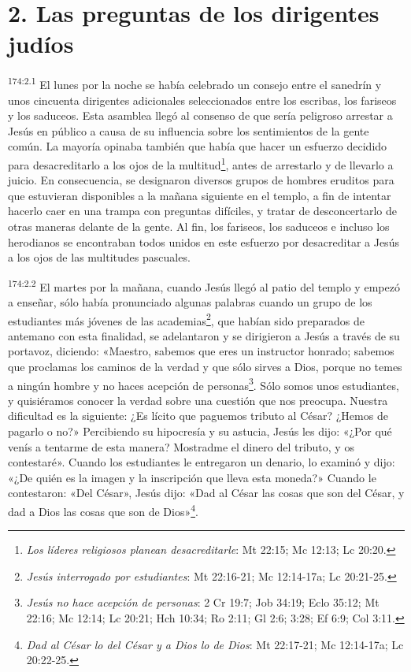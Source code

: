 \section*{2. Las preguntas de los dirigentes judíos}
\par 
\textsuperscript{174:2.1} El lunes por la noche se había celebrado un consejo entre el sanedrín y unos cincuenta dirigentes adicionales seleccionados entre los escribas, los fariseos y los saduceos. Esta asamblea llegó al consenso de que sería peligroso arrestar a Jesús en público a causa de su influencia sobre los sentimientos de la gente común. La mayoría opinaba también que había que hacer un esfuerzo decidido para desacreditarlo a los ojos de la multitud\footnote{\textit{Los líderes religiosos planean desacreditarle}: Mt 22:15; Mc 12:13; Lc 20:20.}, antes de arrestarlo y de llevarlo a juicio. En consecuencia, se designaron diversos grupos de hombres eruditos para que estuvieran disponibles a la mañana siguiente en el templo, a fin de intentar hacerlo caer en una trampa con preguntas difíciles, y tratar de desconcertarlo de otras maneras delante de la gente. Al fin, los fariseos, los saduceos e incluso los herodianos se encontraban todos unidos en este esfuerzo por desacreditar a Jesús a los ojos de las multitudes pascuales.

\par 
\textsuperscript{174:2.2} El martes por la mañana, cuando Jesús llegó al patio del templo y empezó a enseñar, sólo había pronunciado algunas palabras cuando un grupo de los estudiantes más jóvenes de las academias\footnote{\textit{Jesús interrogado por estudiantes}: Mt 22:16-21; Mc 12:14-17a; Lc 20:21-25.}, que habían sido preparados de antemano con esta finalidad, se adelantaron y se dirigieron a Jesús a través de su portavoz, diciendo: «Maestro, sabemos que eres un instructor honrado; sabemos que proclamas los caminos de la verdad y que sólo sirves a Dios, porque no temes a ningún hombre y no haces acepción de personas\footnote{\textit{Jesús no hace acepción de personas}: 2 Cr 19:7; Job 34:19; Eclo 35:12; Mt 22:16; Mc 12:14; Lc 20:21; Hch 10:34; Ro 2:11; Gl 2:6; 3:28; Ef 6:9; Col 3:11.}. Sólo somos unos estudiantes, y quisiéramos conocer la verdad sobre una cuestión que nos preocupa. Nuestra dificultad es la siguiente: ¿Es lícito que paguemos tributo al César? ¿Hemos de pagarlo o no?» Percibiendo su hipocresía y su astucia, Jesús les dijo: «¿Por qué venís a tentarme de esta manera? Mostradme el dinero del tributo, y os contestaré». Cuando los estudiantes le entregaron un denario, lo examinó y dijo: «¿De quién es la imagen y la inscripción que lleva esta moneda?» Cuando le contestaron: «Del César», Jesús dijo: «Dad al César las cosas que son del César, y dad a Dios las cosas que son de Dios»\footnote{\textit{Dad al César lo del César y a Dios lo de Dios}: Mt 22:17-21; Mc 12:14-17a; Lc 20:22-25.}.

